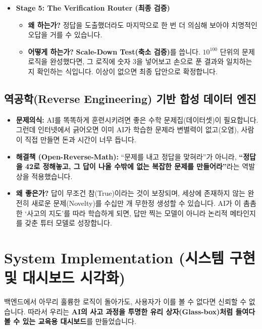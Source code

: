 \documentclass[11pt,a4paper]{article}
\begin{document}
\begin{itemize}
\begin{itemize}
        \item \textbf{어떻게 하는가?} 안전한 샌드박스에서 코드를 실행합니다. 만약 \texttt{TimeoutError}(시간 초과)가 난다면, 모델은 ``아, 숫자가 너무 커서 시뮬레이션은 무리구나. 이론적 방식으로 다시 짜야겠다''라고 스스로 피드백을 받고 전략을 수정합니다.
    \end{itemize}
    \item \textbf{Stage 5: The Verification Router (최종 검증)}
    \begin{itemize}
        \item \textbf{왜 하는가?} 정답을 도출했더라도 마지막으로 한 번 더 의심해 보아야 치명적인 오답을 거를 수 있습니다.
        \item \textbf{어떻게 하는가?} \textbf{Scale-Down Test(축소 검증)}를 씁니다. $10^{100}$ 단위의 문제 로직을 완성했다면, 그 로직에 숫자 3을 넣어보고 손으로 푼 결과와 일치하는지 확인하는 식입니다. 이상이 없으면 최종 답안으로 확정합니다.
    \end{itemize}
\end{itemize}

\subsection{역공학(Reverse Engineering) 기반 합성 데이터 엔진}
\begin{itemize}
    \item \textbf{문제의식:} AI를 똑똑하게 훈련시키려면 좋은 수학 문제집(데이터셋)이 필요합니다. 그런데 인터넷에서 긁어오면 이미 AI가 학습한 문제라 변별력이 없고(오염), 사람이 직접 만들면 돈과 시간이 너무 듭니다.
    \item \textbf{해결책 (Open-Reverse-Math):} ``문제를 내고 정답을 맞혀라''가 아니라, \textbf{``정답을 42로 정해놓고, 그 답이 나올 수밖에 없는 복잡한 문제를 만들어라''}라는 역발상을 적용했습니다.
    \item \textbf{왜 좋은가?} 답이 무조건 참(True)이라는 것이 보장되며, 세상에 존재하지 않는 완전히 새로운 문제(Novelty)를 수십만 개 무한정 생성할 수 있습니다. AI가 이 촘촘한 `사고의 지도'를 따라 학습하게 되면, 답만 찍는 모델이 아니라 논리적 메타인지를 갖춘 튜터 모델로 성장합니다.
\end{itemize}

\section{System Implementation (시스템 구현 및 대시보드 시각화)}
백엔드에서 아무리 훌륭한 로직이 돌아가도, 사용자가 이를 볼 수 없다면 신뢰할 수 없습니다. 따라서 우리는 \textbf{AI의 사고 과정을 투명한 유리 상자(Glass-box)처럼 들여다볼 수 있는 교육용 대시보드}를 만들었습니다.
\end{document}
